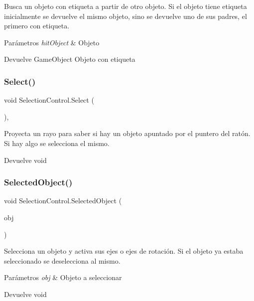 Busca un objeto con etiqueta a partir de otro objeto. Si el objeto tiene etiqueta inicialmente se devuelve el mismo objeto, sino se devuelve uno de sus padres, el primero con etiqueta. 
\begin{DoxyParams}{Parámetros}
{\em hit\+Object} & Objeto \\
\hline
\end{DoxyParams}
\begin{DoxyReturn}{Devuelve}
Game\+Object Objeto con etiqueta 
\end{DoxyReturn}
\mbox{\label{class_selection_control_a6e08e34b6c7bfe54260faeaa29b369c0}} 
\subsubsection{\texorpdfstring{Select()}{Select()}}
{\footnotesize\ttfamily void Selection\+Control.\+Select (\begin{DoxyParamCaption}{ }\end{DoxyParamCaption})\hspace{0.3cm}{\ttfamily [inline]}, {\ttfamily [private]}}

Proyecta un rayo para saber si hay un objeto apuntado por el puntero del ratón. Si hay algo se selecciona el mismo. \begin{DoxyReturn}{Devuelve}
void 
\end{DoxyReturn}
\mbox{\label{class_selection_control_a3da021bd2d11255eadadc832b40e6fb6}} 
\subsubsection{\texorpdfstring{SelectedObject()}{SelectedObject()}}
{\footnotesize\ttfamily void Selection\+Control.\+Selected\+Object (\begin{DoxyParamCaption}\item[{Game\+Object}]{obj }\end{DoxyParamCaption})\hspace{0.3cm}{\ttfamily [inline]}}

Selecciona un objeto y activa sus ejes o ejes de rotación. Si el objeto ya estaba seleccionado se deselecciona al mismo. 
\begin{DoxyParams}{Parámetros}
{\em obj} & Objeto a seleccionar \\
\hline
\end{DoxyParams}
\begin{DoxyReturn}{Devuelve}
void 
\end{DoxyReturn}
\mbox{\label{class_selection_control_af45a0f8f9cf7f200e423971f190d8bbf}} 
